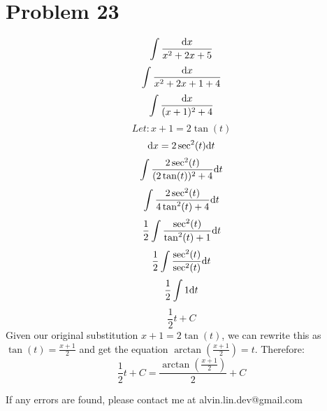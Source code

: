 \documentclass[letterpaper, 12pt]{math}
\begin{document}
\section*{Problem 23}
\[ \int{\frac{\mathrm{d}{x}}{x^{2}+2x+5}} \]
\[ \int{\frac{\mathrm{d}{x}}{x^{2}+2x+1+4}} \]
\[ \int{\frac{\mathrm{d}{x}}{(x+1)^{2}+4}} \]
\[ Let: x+1 = 2\tan(t) \]
\[ \mathrm{d}{x} = 2\sec^{2}(t)\mathrm{d}{t} \]
\[ \int{\frac{2\sec^{2}(t)}{(2\tan(t))^{2}+4}\mathrm{d}{t}} \]
\[ \int{\frac{2\sec^{2}(t)}{4\tan^{2}(t)+4}\mathrm{d}{t}} \]
\[ \frac{1}{2}\int{\frac{\sec^{2}(t)}{\tan^{2}(t)+1}\mathrm{d}{t}} \]
\[ \frac{1}{2}\int{\frac{\sec^{2}(t)}{\sec^{2}(t)}\mathrm{d}{t}} \]
\[ \frac{1}{2}\int{1\mathrm{d}{t}} \]
\[ \frac{1}{2}t+C \]
Given our original substitution \( x+1 = 2\tan(t) \), we can rewrite this as
\( \tan(t) = \frac{x+1}{2} \) and get the equation
\( \arctan(\frac{x+1}{2}) = t \).
Therefore:
\[ \frac{1}{2}t+C = \frac{\arctan(\frac{x+1}{2})}{2}+C \]

\begin{center}
  If any errors are found, please contact me at alvin.lin.dev@gmail.com
\end{center}
\end{document}
